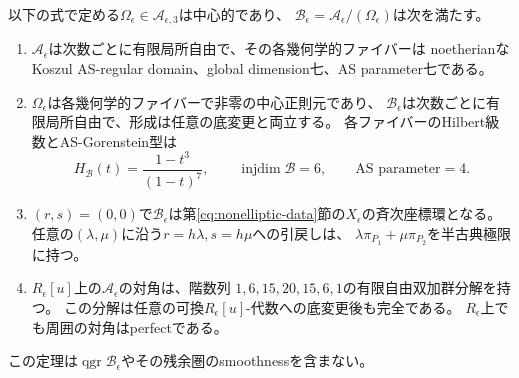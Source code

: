 \begin{theorem}[二つの非楕円成分の代数的量子化]
\label{nq:thm:family}
以下の式で定める$\Omega_\epsilon\in\mathcal A_{\epsilon,3}$は中心的であり、
$\mathcal B_\epsilon=\mathcal A_\epsilon/(\Omega_\epsilon)$は次を満たす。
\begin{enumerate}
\item $\mathcal A_\epsilon$は次数ごとに有限局所自由で、その各幾何学的ファイバーは
noetherianなKoszul AS-regular domain、global dimension七、AS parameter七である。
\item $\Omega_\epsilon$は各幾何学的ファイバーで非零の中心正則元であり、
$\mathcal B_\epsilon$は次数ごとに有限局所自由で、形成は任意の底変更と両立する。
各ファイバーのHilbert級数とAS-Gorenstein型は
\begin{equation}
 H_{\mathcal B}(t)=\frac{1-t^3}{(1-t)^7},\qquad
 \operatorname{injdim}\mathcal B=6,\qquad \text{AS parameter}=4.
\end{equation}
\item $(r,s)=(0,0)$で$\mathcal B_\epsilon$は第\ref{cq:nonelliptic-data}節の$X_\epsilon$の斉次座標環となる。
任意の$(\lambda,\mu)$に沿う$r=h\lambda,s=h\mu$への引戻しは、
$\lambda\pi_{P_1}+\mu\pi_{P_2}$を半古典極限に持つ。
\item $R_\epsilon[u]$上の$\mathcal A_\epsilon$の対角は、階数列
$1,6,15,20,15,6,1$の有限自由双加群分解を持つ。
この分解は任意の可換$R_\epsilon[u]$-代数への底変更後も完全である。
$R_\epsilon$上でも周囲の対角はperfectである。
\end{enumerate}
この定理は$\operatorname{qgr}\mathcal B_\epsilon$やその残余圏のsmoothnessを含まない。
\end{theorem}

